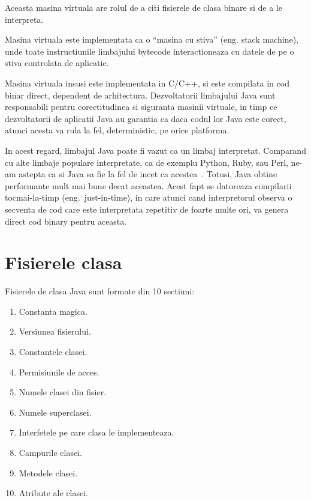 Aceasta masina virtuala are rolul de a citi fisierele de clasa binare si
de a le interpreta.

Masina virtuala este implementata ca o ``masina cu stiva'' (eng. stack
machine), unde toate instructiunile limbajului bytecode interactioneaza
cu datele de pe o stiva controlata de aplicatie.

Masina virtuala insusi este implementata in C/C++, si este compilata in
cod binar direct, dependent de arhitectura. Dezvoltatorii limbajului
Java sunt responsabili pentru corectitudinea si siguranta masinii
virtuale, in timp ce dezvoltatorii de aplicatii Java au garantia ca daca
codul lor Java este corect, atunci acesta va rula la fel, deterministic,
pe orice platforma.

In acest regard, limbajul Java poate fi vazut ca un limbaj interpretat.
Comparand cu alte limbaje populare interpretate, ca de exemplu Python,
Ruby, sau Perl, ne-am astepta ca si Java sa fie la fel de incet ca
acestea~\cite{language_benchmarks}.
Totusi, Java obtine performante mult mai bune decat
aceastea. Acest fapt se datoreaza compilarii tocmai-la-timp (eng.\
just-in-time), in care atunci cand interpretorul observa o secventa de
cod care este interpretata repetitiv de foarte multe ori, va genera
direct cod binary pentru aceasta.

\section{Fisierele clasa}

Fisierele de clasa Java sunt formate din 10
sectiuni\cite{classfile_sections}:

\begin{enumerate}
	\item
	      Constanta magica.
	\item
	      Versiunea fisierului.
	\item
	      Constantele clasei.
	\item
	      Permisiunile de acces.
	\item
	      Numele clasei din fisier.
	\item
	      Numele superclasei.
	\item
	      Interfetele pe care clasa le implementeaza.
	\item
	      Campurile clasei.
	\item
	      Metodele clasei.
	\item
	      Atribute ale clasei.
\end{enumerate}

